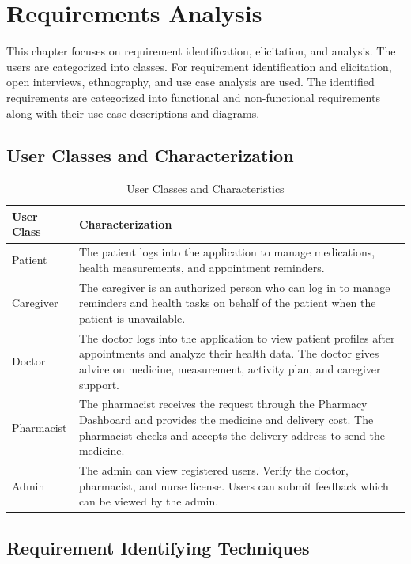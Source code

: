 \chapter{Requirements Analysis}
\label{ch:analysis}

This chapter focuses on requirement identification, elicitation, and analysis. The users are categorized into classes. For requirement identification and elicitation, open interviews, ethnography, and use case analysis are used. The identified requirements are categorized into functional and non-functional requirements along with their use case descriptions and diagrams.

\section{User Classes and Characterization}
\label{sec:user-classes}

\begin{table}[H]
\centering
\caption{User Classes and Characteristics}
\label{tab:user-classes}
\begin{tabularx}{\textwidth}{|l|X|}
\hline
\textbf{User Class} & \textbf{Characterization} \\ \hline
Patient & The patient logs into the application to manage medications, health measurements, and appointment reminders. \\ \hline
Caregiver & The caregiver is an authorized person who can log in to manage reminders and health tasks on behalf of the patient when the patient is unavailable. \\ \hline
Doctor & The doctor logs into the application to view patient profiles after appointments and analyze their health data. The doctor gives advice on medicine, measurement, activity plan, and caregiver support. \\ \hline
Pharmacist & The pharmacist receives the request through the Pharmacy Dashboard and provides the medicine and delivery cost. The pharmacist checks and accepts the delivery address to send the medicine. \\ \hline
Admin & The admin can view registered users. Verify the doctor, pharmacist, and nurse license. Users can submit feedback which can be viewed by the admin. \\ \hline
\end{tabularx}
\end{table}

\section{Requirement Identifying Techniques}
\label{sec:req-techniques}

